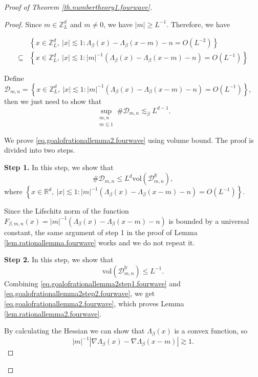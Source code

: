 \begin{proof}[Proof of Theorem \ref{th.numbertheory1.fourwave}]
\begin{proof}
Since $m\in\mathbb{Z}^d_L$ and $m\ne 0$, we have $|m|\ge L^{-1}$. Therefore, we have

\begin{equation}
\begin{split}
    &\left\{x\in \mathbb{Z}^d_L,\ |x|\lesssim 1: \Lambda_{\beta}(x)-\Lambda_{\beta}(x-m)-n=O(L^{-2})\right\}
    \\
    \subseteq& \left\{x\in \mathbb{Z}^d_L,\ |x|\lesssim 1: |m|^{-1}(\Lambda_{\beta}(x)-\Lambda_{\beta}(x-m)-n)=O(L^{-1})\right\}
\end{split}
\end{equation}

Define $\mathcal{D}_{m,n}=\left\{x\in \mathbb{Z}^d_L,\ |x|\lesssim 1: |m|^{-1}(\Lambda_{\beta}(x)-\Lambda_{\beta}(x-m)-n)=O(L^{-1})\right\}$, then we just need to show that 
\begin{equation}\label{eq.goalofrationallemma2.fourwave}
    \sup_{\substack{m,n\\m\lesssim 1}} \#\mathcal{D}_{m,n}\lesssim_{\beta} L^{d-1} .
\end{equation}

We prove \eqref{eq.goalofrationallemma2.fourwave} using volume bound. The proof is divided into two steps.

\textbf{Step 1.} In this step, we show that 
\begin{equation}\label{eq.goalofrationallemma2step1.fourwave}
    \#\mathcal{D}_{m,n}\le L^{d} \text{vol}(\mathcal{D}^{\mathbb{R}}_{m,n}),
\end{equation}
where $\left\{x\in \mathbb{R}^d,\ |x|\lesssim 1: |m|^{-1}(\Lambda_{\beta}(x)-\Lambda_{\beta}(x-m)-n)=O(L^{-1})\right\}$.

Since the Lifschitz norm of the function $F_{\beta,m,n}(x)=|m|^{-1}(\Lambda_{\beta}(x)-\Lambda_{\beta}(x-m)-n)$ is bounded by a universal constant, the same argument of step 1 in the proof of Lemma \ref{lem.rationallemma.fourwave} works and we do not repeat it.

\textbf{Step 2.} In this step, we show that 
\begin{equation}\label{eq.goalofrationallemma2step2.fourwave}
    \text{vol}(\mathcal{D}^{\mathbb{R}}_{m,n})\le L^{-1}.
\end{equation}
Combining \eqref{eq.goalofrationallemma2step1.fourwave} and \eqref{eq.goalofrationallemma2step2.fourwave}, we get
\eqref{eq.goalofrationallemma2.fourwave}, which proves Lemma \ref{lem.rationallemma2.fourwave}.


By calculating the Hessian we can show that $\Lambda_{\beta}(x)$ is a convex function, so
\begin{equation}
    |m|^{-1}\left|\nabla\Lambda_{\beta}(x)-\nabla\Lambda_{\beta}(x-m)\right|\gtrsim 1.
\end{equation}


\end{proof}
\end{proof}
